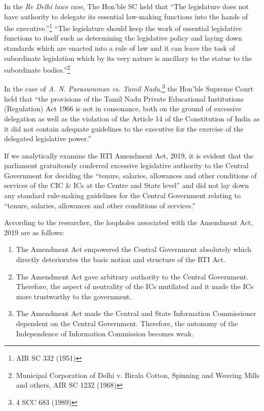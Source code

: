 \begin{multicols}{2}
\noi
In the \textit{Re Delhi laws case}, The Hon’ble SC held that “The legislature does not have authority
to delegate its essential law-making functions into the hands of the executive.”\footnote{AIR SC 332 (1951)} “The
legislature should keep the work of essential legislative functions to itself such as
determining the legislative policy and laying down standards which are enacted into a rule of
law and it can leave the task of subordinate legislation which by its very nature is ancillary to
the statue to the subordinate bodies.”\footnote{Municipal Corporation of Delhi v. Birala Cotton, Spinning and Weaving Mills and others, AIR SC 1232 (1968)}

\noi
In the case of \textit{A. N. Parasuraman vs. Tamil Nadu,}\footnote{4 SCC 683 (1989)} the Hon’ble Supreme Court held that “the
provisions of the Tamil Nadu Private Educational Institutions (Regulation) Act 1966 is not in
consonance, both on the ground of excessive delegation as well as the violation of the Article
14 of the Constitution of India as it did not contain adequate guidelines to the executive for
the exercise of the delegated legislative power.”

\noi
If we analytically examine the RTI Amendment Act, 2019, it is evident that the parliament
gratuitously conferred excessive legislative authority to the Central Government for deciding
the “tenure, salaries, allowances and other conditions of services of the CIC \& ICs at the 
Centre and State level” and did not lay down any standard rule-making guidelines for the
Central Government relating to “tenure, salaries, allowances and other conditions of
services.”


\noi
According to the researcher, the loopholes associated with the Amendment Act, 2019 are as
follows:

\begin{enumerate}
\itemsep=0pt
\item The Amendment Act empowered the Central Government absolutely which directly
deteriorates the basic notion and structure of the RTI Act.

\item The Amendment Act gave arbitrary authority to the Central Government. Therefore,
the aspect of neutrality of the ICs mutilated and it made the ICs more trustworthy to
the government.

\item The Amendment Act made the Central and State Information Commissioner
dependent on the Central Government. Therefore, the autonomy of the Independence
of Information Commission becomes weak.


\end{enumerate}
\end{multicols}
